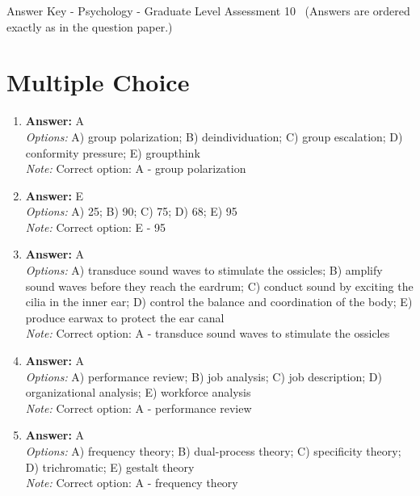\documentclass[12pt]{article}
\begin{document}
\begin{center}
Answer Key - Psychology - Graduate Level Assessment 10 \
\small (Answers are ordered exactly as in the question paper.)
\end{center}

\section*{Multiple Choice}
\begin{enumerate}[label=\arabic*.]
\item \textbf{Answer:} A
\\ \textit{Options:} A) group polarization; B) deindividuation; C) group escalation; D) conformity pressure; E) groupthink
\\ \textit{Note:} Correct option: A - group polarization
\item \textbf{Answer:} E
\\ \textit{Options:} A) 25; B) 90; C) 75; D) 68; E) 95
\\ \textit{Note:} Correct option: E - 95
\item \textbf{Answer:} A
\\ \textit{Options:} A) transduce sound waves to stimulate the ossicles; B) amplify sound waves before they reach the eardrum; C) conduct sound by exciting the cilia in the inner ear; D) control the balance and coordination of the body; E) produce earwax to protect the ear canal
\\ \textit{Note:} Correct option: A - transduce sound waves to stimulate the ossicles
\item \textbf{Answer:} A
\\ \textit{Options:} A) performance review; B) job analysis; C) job description; D) organizational analysis; E) workforce analysis
\\ \textit{Note:} Correct option: A - performance review
\item \textbf{Answer:} A
\\ \textit{Options:} A) frequency theory; B) dual-process theory; C) specificity theory; D) trichromatic; E) gestalt theory
\\ \textit{Note:} Correct option: A - frequency theory
\end{enumerate}
\end{document}
